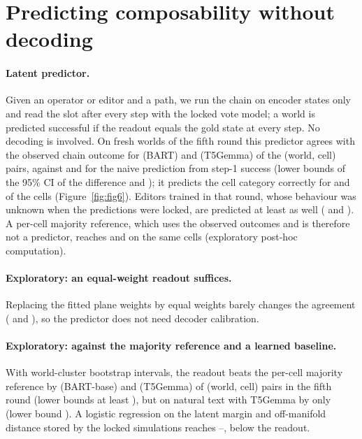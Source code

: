 \section{Predicting composability without decoding}\label{sec:prediction}
\paragraph{Latent predictor.}
Given an operator or editor and a path, we run the chain on encoder states only and read the slot after every step with the locked vote
model; a world is predicted successful if the readout equals the gold state at every step. No decoding is involved. On fresh worlds of
the fifth round this predictor agrees with the observed chain outcome for \CLeightAgreeBart{} (BART) and \CLeightAgreeTfive{}
(T5Gemma) of the (world, cell) pairs, against \CLeightNaiveBart{} and \CLeightNaiveTfive{} for the naive prediction from step-1
success (lower bounds of the 95\% CI of the difference \CLeightDiffLoBart{} and \CLeightDiffLoTfive{}); it predicts the cell
category correctly for \CLeightCatBart{} and \CLeightCatTfive{} of the cells (Figure~\ref{fig:fig6}). Editors trained in that round,
whose behaviour was unknown when the predictions were locked, are predicted at least as well (\CLeightNewBart{} and \CLeightNewTfive{}).
A per-cell majority reference, which uses the observed outcomes and is therefore not a predictor, reaches \CLeightMajBart{} and
\CLeightMajTfive{} on the same cells (exploratory post-hoc computation).

\paragraph{Exploratory: an equal-weight readout suffices.}
Replacing the fitted plane weights by equal weights barely changes the agreement (\CLeightbEqualBart{} and \CLeightbEqualTfive{}), so the
predictor does not need decoder calibration.

\paragraph{Exploratory: against the majority reference and a learned baseline.}
With world-cluster bootstrap intervals, the readout beats the per-cell majority reference by \CLtwentysevenVfiveBart{} (BART-base) and
\CLtwentysevenVfiveTfive{} (T5Gemma) of (world, cell) pairs in the fifth round (lower bounds at least \CLtwentysevenVfiveLo{}), but on
natural text with T5Gemma by only \CLtwentysevenNatTfive{} (lower bound \CLtwentysevenNatTfiveLo{}). A logistic regression on the latent
margin and off-manifold distance stored by the locked simulations reaches \CLtwentysevenLbLo{}--\CLtwentysevenLbHi{}, below the readout.

